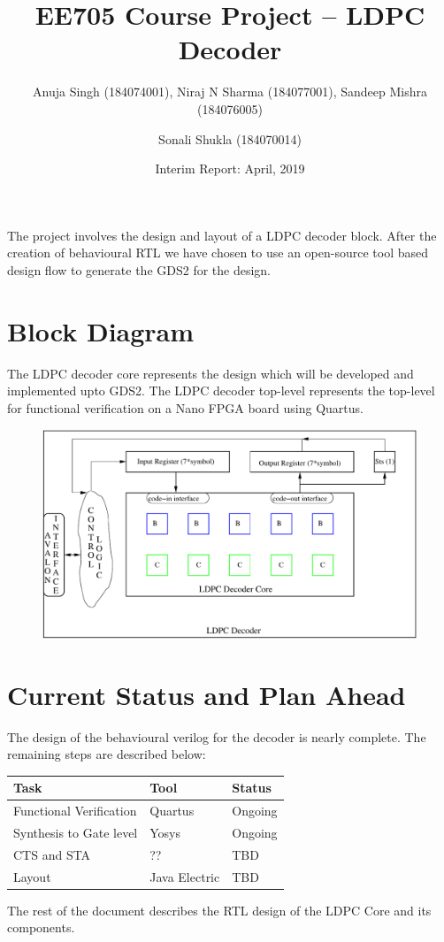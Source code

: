 \documentclass[11pt, a4paper]{article}
\title{EE705 Course Project -- LDPC Decoder}
\author{Anuja Singh (184074001), Niraj N Sharma (184077001), Sandeep Mishra (184076005) \and Sonali Shukla (184070014)}
\date{Interim Report: April, 2019}
\begin{document}
\maketitle
The project involves the design and layout of a LDPC decoder block. After
the creation of behavioural RTL we have chosen to use an open-source tool
based design flow to generate the GDS2 for the design.

\section{Block Diagram}
The LDPC decoder core represents the design which will be developed and
implemented upto GDS2. The LDPC decoder top-level represents the top-level
for functional verification on a Nano FPGA board using Quartus. 

\begin{figure}[hbt]
\includegraphics[width=\linewidth]{block-diagram.pdf}
\label{fig:bd}
\end{figure}

\section{Current Status and Plan Ahead}
The design of the behavioural verilog for the decoder is nearly complete. The
remaining steps are described below:
\begin{center}
   \begin{tabular}{lll}
      \hline
      Task & Tool & Status\\
      \hline
      Functional Verification & Quartus & Ongoing\\
      Synthesis to Gate level & Yosys & Ongoing\\
      CTS and STA & ?? & TBD\\
      Layout & Java Electric & TBD\\
      \hline
   \end{tabular}
\end{center}

The rest of the document describes the RTL design of the LDPC Core and its
components.



\end{document}

